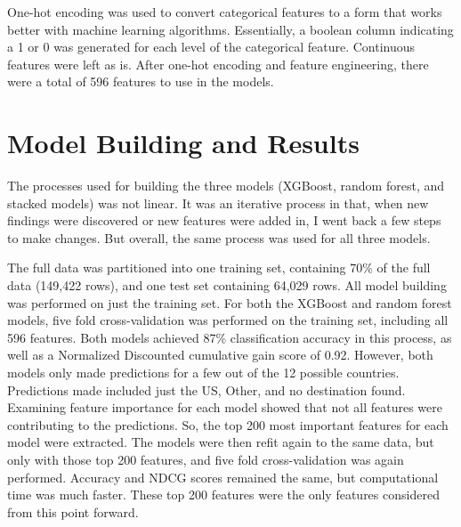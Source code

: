 \documentclass{article}
\begin{document}
One-hot encoding was used to convert categorical features to a form that works better with machine learning 
algorithms. Essentially, a boolean column indicating a 1 or 0 was generated for each level of the categorical feature.
Continuous features were left as is. After one-hot encoding and feature engineering, there were a total of 596
features to use in the models. 

\section{Model Building and Results}

The processes used for building the three models (XGBoost, random forest, and stacked models) was not linear.
It was an iterative process in that, when new findings were discovered or new features were added in, I went back 
a few steps to make changes. But overall, the same process was used for all three models. 


The full data was partitioned into one training set, containing 70\% of the full data (149,422 rows), and one 
test set containing 64,029 rows. All model building was performed on just the training set. For both the XGBoost 
and random forest models, five fold cross-validation was performed on the training set, including all 596 features. 
Both models achieved 87\% classification accuracy in this process, as well as a Normalized Discounted cumulative
gain score of 0.92. However, both models only made predictions for a few out of the 12 possible countries. Predictions
made included just the US, Other, and no destination found. Examining feature importance for each model showed that not 
all features were contributing to the predictions. So, the top 200 most important features for each model were extracted. 
The models were then refit again to the same data, but only with those top 200 features, and five fold cross-validation 
was again performed. Accuracy and NDCG scores remained the same, but computational time was much faster. These 
top 200 features were the only features considered from this point forward. 
\end{document}
